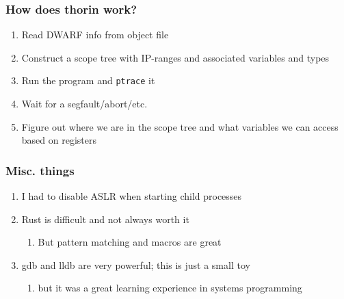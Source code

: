 \documentclass{beamer}
\begin{document}
\begin{frame}
\frametitle{How does thorin work?}
\begin{enumerate}
\item{Read DWARF info from object file}
\item{Construct a scope tree with IP-ranges and associated variables and types}
\item{Run the program and \texttt{ptrace} it}
\item{Wait for a segfault/abort/etc.}
\item{Figure out where we are in the scope tree and what variables we can access based on registers}
\end{enumerate}
\end{frame}

\begin{frame}
\frametitle{Misc. things}
\begin{enumerate}
\item{I had to disable ASLR when starting child processes}
\item{
Rust is difficult and not always worth it
\begin{enumerate}
\item{But pattern matching and macros are great}
\end{enumerate}
}
\item{
gdb and lldb are very powerful; this is just a small toy
\begin{enumerate}
\item{but it was a great learning experience in systems programming}
\end{enumerate}
}
\end{enumerate}
\end{frame}
\end{document}
